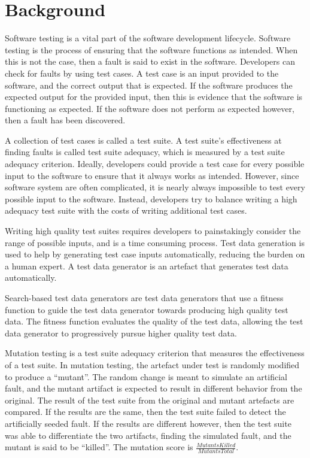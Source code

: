 \section{Background}
Software testing is a vital part of the software development lifecycle.  Software testing is the
process of ensuring that the software functions as intended.  When this is not the case, then a fault
is said to exist in the software. Developers can check for faults by using test cases. A test case is
an input provided to the software, and the correct output that is expected. If the software produces
the expected output for the provided input, then this is evidence that the software is functioning as
expected.  If the software does not perform as expected however, then a fault has been discovered.

A collection of test cases is called a test suite. A test suite's effectiveness at finding faults is
called test suite adequacy, which is measured by a test suite adequacy criterion.
Ideally, developers could provide a test case for every possible input to the software to ensure
that it always works as intended. However, since
software system are often complicated, it is nearly always impossible to test every possible
input to the software. Instead, developers try to balance writing a high adequacy test suite
with the costs of writing additional test cases.

Writing high quality test suites requires developers to painstakingly consider the
range of possible inputs, and is a time consuming process. Test data generation is used to
help by generating test case inputs automatically, reducing the burden on a human expert. A test data
generator is an artefact that generates test data automatically.

Search-based test data generators are test data generators that use a fitness function to guide the
test data generator towards producing high quality test data. The fitness function evaluates the
quality of the test data, allowing the test data generator to progressively pursue higher quality test 
data.

Mutation testing is a test suite adequacy criterion that measures the effectiveness of a test suite. In
mutation testing, the artefact under test is randomly modified to produce a ``mutant''. The random
change is meant to simulate an artificial fault, and the mutant artifact is expected to result in
different behavior from the original. The result of the test suite from the original and mutant
artefacts are compared. If the results are the same, then the test suite failed to detect the
artificially seeded fault. If the results are different however, then the test suite was able to
differentiate the two artifacts, finding the simulated fault, and the mutant is said to be ``killed''.
The mutation score is $\frac{\mathit{MutantsKilled}}{\mathit{MutantsTotal}}$.

